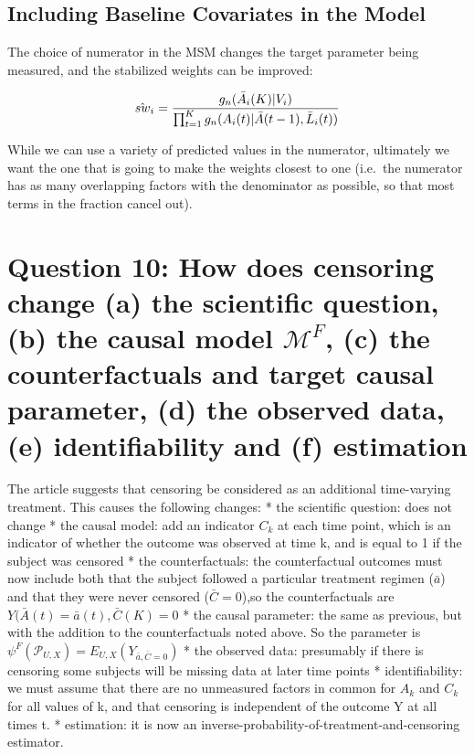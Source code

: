 \documentclass[]{article}
\begin{document}
\subsection{Including Baseline Covariates in the
Model}\label{including-baseline-covariates-in-the-model-1}

The choice of numerator in the MSM changes the target parameter being
measured, and the stabilized weights can be improved: \vspace{-5mm}

\begin{align*}
\hat{sw}_\mathnormal{i} = \frac{g_n(\bar{A}_\mathnormal{i}(K)|V_i)}{\prod_{t=1}^Kg_n(A_\mathnormal{i}(t)|\bar{A}(t-1), \bar{L}_\mathnormal{i}(t))}\\
\end{align*}

While we can use a variety of predicted values in the numerator,
ultimately we want the one that is going to make the weights closest to
one (i.e.~the numerator has as many overlapping factors with the
denominator as possible, so that most terms in the fraction cancel out).

\section{\texorpdfstring{Question 10: How does censoring change (a) the
scientific question, (b) the causal model \(\mathcal{M}^F\), (c) the
counterfactuals and target causal parameter, (d) the observed data, (e)
identifiability and (f)
estimation}{Question 10: How does censoring change (a) the scientific question, (b) the causal model \textbackslash{}mathcal\{M\}\^{}F, (c) the counterfactuals and target causal parameter, (d) the observed data, (e) identifiability and (f) estimation}}\label{question-10-how-does-censoring-change-a-the-scientific-question-b-the-causal-model-mathcalmf-c-the-counterfactuals-and-target-causal-parameter-d-the-observed-data-e-identifiability-and-f-estimation}

The article suggests that censoring be considered as an additional
time-varying treatment. This causes the following changes: * the
scientific question: does not change * the causal model: add an
indicator \(C_k\) at each time point, which is an indicator of whether
the outcome was observed at time k, and is equal to 1 if the subject was
censored * the counterfactuals: the counterfactual outcomes must now
include both that the subject followed a particular treatment regimen
(\(\bar{a}\)) and that they were never censored (\(\bar{C}=0\)),so the
counterfactuals are \(Y(\bar{A}(t)= \bar{a}(t), \bar{C}(K)=0\) * the
causal parameter: the same as previous, but with the addition to the
counterfactuals noted above. So the parameter is
\(\psi^F (\mathcal{P}_{U,X})= E_{U,X}(Y_{\bar{a}, \bar{C}=0})\) * the
observed data: presumably if there is censoring some subjects will be
missing data at later time points * identifiability: we must assume that
there are no unmeasured factors in common for \(A_k\) and \(C_k\) for
all values of k, and that censoring is independent of the outcome Y at
all times t. * estimation: it is now an
inverse-probability-of-treatment-and-censoring estimator.
\end{document}

